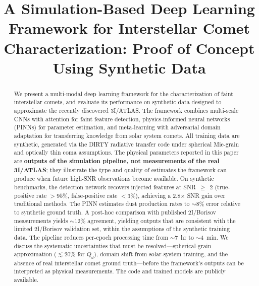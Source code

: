 \documentclass[preprint2]{aastex631}
\begin{document}
\title{A Simulation-Based Deep Learning Framework for Interstellar Comet Characterization: Proof of Concept Using Synthetic Data}

%
%

\accepted{}
\published{}

\begin{abstract}
We present a multi-modal deep learning framework for the characterization of faint interstellar comets, and evaluate its performance on synthetic data designed to approximate the recently discovered 3I/ATLAS. The framework combines multi-scale CNNs with attention for faint feature detection, physics-informed neural networks (PINNs) for parameter estimation, and meta-learning with adversarial domain adaptation for transferring knowledge from solar system comets. All training data are synthetic, generated via the DIRTY radiative transfer code under spherical Mie-grain and optically thin coma assumptions. The physical parameters reported in this paper are \textbf{outputs of the simulation pipeline, not measurements of the real 3I/ATLAS}; they illustrate the type and quality of estimates the framework can produce when future high-SNR observations become available. On synthetic benchmarks, the detection network recovers injected features at SNR~$\geq$~2 (true-positive rate $>95\%$, false-positive rate $<3\%$), achieving a 2.8$\times$ SNR gain over traditional methods. The PINN estimates dust production rates to $\sim$8\% error relative to synthetic ground truth. A post-hoc comparison with published 2I/Borisov measurements yields $\sim$12\% agreement, yielding outputs that are consistent with the limited 2I/Borisov validation set, within the assumptions of the synthetic training data. The pipeline reduces per-epoch processing time from $\sim$7~hr to $\sim$4~min. We discuss the systematic uncertainties that must be resolved---spherical-grain approximation ($\lesssim 20\%$ for $Q_d$), domain shift from solar-system training, and the absence of real interstellar comet ground truth---before the framework's outputs can be interpreted as physical measurements. The code and trained models are publicly available.
\end{abstract}
\end{document}
